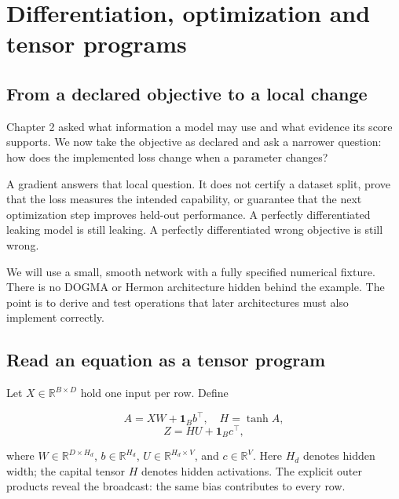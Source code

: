 \chapter{Differentiation, optimization and tensor programs}



\section{From a declared objective to a local
change}\label{from-a-declared-objective-to-a-local-change}

Chapter 2 asked what information a model may use and what evidence its
score supports. We now take the objective as declared and ask a narrower
question: how does the implemented loss change when a parameter changes?

A gradient answers that local question. It does not certify a dataset
split, prove that the loss measures the intended capability, or
guarantee that the next optimization step improves held-out performance.
A perfectly differentiated leaking model is still leaking. A perfectly
differentiated wrong objective is still wrong.

We will use a small, smooth network with a fully specified numerical
fixture. There is no DOGMA or Hermon architecture hidden behind the
example. The point is to derive and test operations that later
architectures must also implement correctly.

\section{Read an equation as a tensor
program}\label{read-an-equation-as-a-tensor-program}

Let \(X\in\mathbb R^{B\times D}\) hold one input per row. Define

\begin{equation}
A=XW+\mathbf1_B b^\top,\quad H=\tanh A,
\end{equation} \begin{equation}
Z=HU+\mathbf1_B c^\top,
\end{equation}

where \(W\in\mathbb R^{D\times H_d}\), \(b\in\mathbb R^{H_d}\),
\(U\in\mathbb R^{H_d\times V}\), and \(c\in\mathbb R^V\). Here \(H_d\)
denotes hidden width; the capital tensor \(H\) denotes hidden
activations. The explicit outer products reveal the broadcast: the same
bias contributes to every row.

